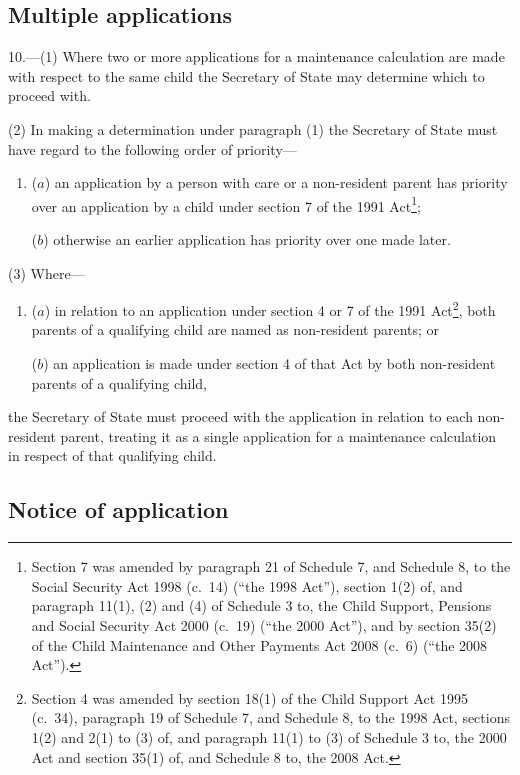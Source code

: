 \documentclass[12pt,a4paper]{article}
\begin{document}
\subsection[10. Multiple applications]{Multiple applications}

10.---(1)  Where two or more applications for a maintenance calculation are made with respect to the same child the Secretary of State may determine which to proceed with.

(2) In making a determination under paragraph (1) the Secretary of State must have regard to the following order of priority—
\begin{enumerate}\item[]
($a$) an application by a person with care or a non-resident parent has priority over an application by a child under section 7 of the 1991 Act\footnote{Section 7 was amended by paragraph 21 of Schedule 7, and Schedule 8, to the Social Security Act 1998 (c.~14) (“the 1998 Act”), section 1(2) of, and paragraph 11(1), (2) and (4) of Schedule 3 to, the Child Support, Pensions and Social Security Act 2000 (c.~19) (“the 2000 Act”), and by section 35(2) of the Child Maintenance and Other Payments Act 2008 (c.~6) (“the 2008 Act”).};

($b$) otherwise an earlier application has priority over one made later.
\end{enumerate}

(3) Where—
\begin{enumerate}\item[]
($a$) in relation to an application under section 4 or 7 of the 1991 Act\footnote{Section 4 was amended by section 18(1) of the Child Support Act 1995 (c.~34), paragraph 19 of Schedule 7, and Schedule 8, to the 1998 Act, sections 1(2) and 2(1) to (3) of, and paragraph 11(1) to (3) of Schedule 3 to, the 2000 Act and section 35(1) of, and Schedule 8 to, the 2008 Act.}, both parents of a qualifying child are named as non-resident parents; or

($b$) an application is made under section 4 of that Act by both non-resident parents of a qualifying child,
\end{enumerate}
the Secretary of State must proceed with the application in relation to each non-resident parent, treating it as a single application for a maintenance calculation in respect of that qualifying child.

\subsection[11. Notice of application]{Notice of application}
\end{document}
